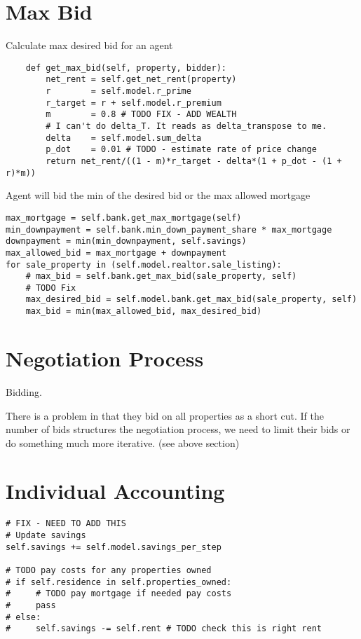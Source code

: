 \section{Max Bid}

Calculate max desired bid for an agent
\begin{lstlisting}
    def get_max_bid(self, property, bidder):
        net_rent = self.get_net_rent(property)
        r        = self.model.r_prime   
        r_target = r + self.model.r_premium
        m        = 0.8 # TODO FIX - ADD WEALTH
        # I can't do delta_T. It reads as delta_transpose to me.
        delta    = self.model.sum_delta 
        p_dot    = 0.01 # TODO - estimate rate of price change
        return net_rent/((1 - m)*r_target - delta*(1 + p_dot - (1 + r)*m))
\end{lstlisting}

Agent will bid the min of the desired bid or the max allowed mortgage
\begin{lstlisting}
max_mortgage = self.bank.get_max_mortgage(self)
min_downpayment = self.bank.min_down_payment_share * max_mortgage
downpayment = min(min_downpayment, self.savings)
max_allowed_bid = max_mortgage + downpayment
for sale_property in (self.model.realtor.sale_listing):
    # max_bid = self.bank.get_max_bid(sale_property, self)
    # TODO Fix
    max_desired_bid = self.model.bank.get_max_bid(sale_property, self)
    max_bid = min(max_allowed_bid, max_desired_bid)
\end{lstlisting}

\section{Negotiation Process}

Bidding.

There is a problem in that they bid on all properties as a short cut. If the number of bids structures the negotiation process, we need to limit their bids or do something much more iterative. (see above section)




\section{Individual Accounting}

\begin{lstlisting}
# FIX - NEED TO ADD THIS
# Update savings
self.savings += self.model.savings_per_step

# TODO pay costs for any properties owned
# if self.residence in self.properties_owned:
#     # TODO pay mortgage if needed pay costs
#     pass
# else:
#     self.savings -= self.rent # TODO check this is right rent
\end{lstlisting}